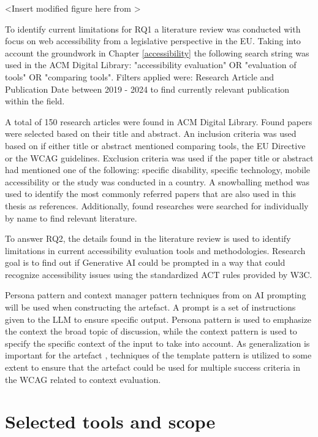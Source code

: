 <Insert modified figure here from \textcite{iterativedesignscience}>

To identify current limitations for RQ1 a literature review was conducted with focus on web accessibility from a legislative perspective in the EU. Taking into account the groundwork in Chapter \ref{accessibility} the following search string was used in the ACM Digital Library: "accessibility evaluation" OR "evaluation of tools" OR "comparing tools". Filters applied were: Research Article and Publication Date between 2019 - 2024 to find currently relevant publication within the field. 

A total of 150 research articles were found in ACM Digital Library. Found papers were selected based on their title and abstract. An inclusion criteria was used based on if either title or abstract mentioned comparing tools, the EU Directive or the WCAG guidelines. Exclusion criteria was used if the paper title or abstract had mentioned one of the following: specific disability, specific technology, mobile accessibility or the study was conducted in a country. A snowballing method was used to identify the most commonly referred papers that are also used in this thesis as references. Additionally, found researches were searched for individually by name to find relevant literature.

To answer RQ2, the details found in the literature review is used to identify limitations in current accessibility evaluation tools and methodologies. Research goal is to find out if Generative AI could be prompted in a way that could recognize accessibility issues using the standardized ACT rules provided by W3C. 

Persona pattern and context manager pattern techniques from \textcite{white2023prompt} on AI prompting will be used when constructing the artefact. A prompt is a set of instructions given to the LLM to ensure specific output. Persona pattern is used to emphasize the context the broad topic of discussion, while the context pattern is used to specify the specific context of the input to take into account. As generalization is important for the artefact \citep{design_science_eval}, techniques of the template pattern is utilized to some extent to ensure that the artefact could be used for multiple success criteria in the WCAG related to context evaluation.

\section{Selected tools and scope}

